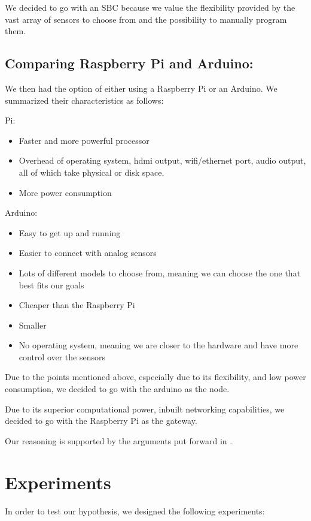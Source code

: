 		We decided to go with an SBC because we value the flexibility provided by the vast array of sensors to choose from and the possibility to manually program them.



\subsection{Comparing Raspberry Pi and Arduino:}

	We then had the option of either using a Raspberry Pi or an Arduino. We summarized their characteristics as follows:

	Pi:
	\begin{itemize}
		\item Faster and more powerful processor
		\item Overhead of operating system, hdmi output, wifi/ethernet port, audio output, all of which take physical or disk space.
		\item More power consumption
	\end{itemize}

	Arduino:
	\begin{itemize}
		\item Easy to get up and running
		\item Easier to connect with analog sensors
		\item Lots of different models to choose from, meaning we can choose the one that best fits our goals
		\item Cheaper than the Raspberry Pi
		\item Smaller 
		\item No operating system, meaning we are closer to the hardware and have more control over the sensors
	\end{itemize}

	Due to the points mentioned above, especially due to its flexibility, and low power consumption, we decided to go with the arduino as the node.

	Due to its superior computational power, inbuilt networking capabilities, we decided to go with the Raspberry Pi as the gateway.

	Our reasoning is supported by the arguments put forward in \cite{postolache2011smart}.



\section{Experiments}
In order to test our hypothesis, we designed the following experiments:


